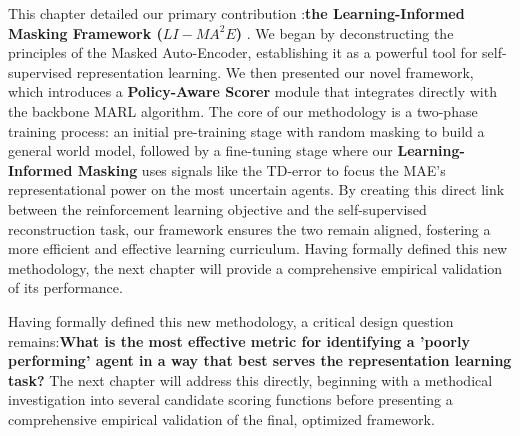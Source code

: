 This chapter detailed our primary contribution :\textbf{the Learning-Informed Masking Framework ($LI-{MA}^2E$)} . We began by deconstructing the principles of the Masked Auto-Encoder, establishing it as a powerful tool for self-supervised representation learning. We then presented our novel framework, which introduces a \textbf{Policy-Aware Scorer} module that integrates directly with the backbone MARL algorithm. The core of our methodology is a two-phase training process: an initial pre-training stage with random masking to build a general world model, followed by a fine-tuning stage where our \textbf{Learning-Informed Masking} uses signals like the TD-error to focus the MAE's representational power on the most uncertain agents. By creating this direct link between the reinforcement learning objective and the self-supervised reconstruction task, our framework ensures the two remain aligned, fostering a more efficient and effective learning curriculum. Having formally defined this new methodology, the next chapter will provide a comprehensive empirical validation of its performance.

Having formally defined this new methodology, a critical design question remains:\textbf{What is the most effective metric for identifying a 'poorly performing' agent in a way that best serves the representation learning task?}  The next chapter will address this directly, beginning with a methodical investigation into several candidate scoring functions before presenting a comprehensive empirical validation of the final, optimized framework.